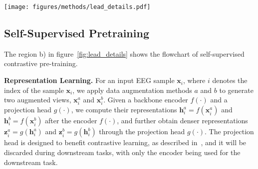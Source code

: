 \begin{figure*}
    \centering
    \texttt{[image: figures/methods/lead\_details.pdf]}
    \caption{\textbf{Details of LEAD method.} \textbf{a)} The pipeline for our method includes data preprocessing, sample indices shuffling, self-supervised pre-training, multi-dataset fine-tuning, sample-level classification, and subject-level AD detection. \textbf{b)} The flowchart of the self-supervised pre-training. A batch of samples is applied with two augmentations $a$ and $b$ to generate two augmented views, $\bm{x}_i^a$ and $\bm{x}_i^b$. The number in each sample is the subject ID. The representation $\bm{z}_i^a$ and $\bm{z}_i^b$ after encoder $f(\cdot)$ and projection head $g(\cdot)$ are used for contrastive learning. Two augmented views from the same sample are positive pairs for sample-level contrast. For subject-level contrast, samples with the same subject IDs are positive pairs. \textbf{c)} The backbone encoder $f(\cdot)$ includes two branches. The temporal branch takes cross-channel patches to embed as tokens. The spatial branch takes the whole series of channels to embed as tokens. The two branches are computed in parallel.
    }
    \label{fig:lead_details}
    \vspace{-5mm}
\end{figure*}



\subsection{Self-Supervised Pretraining}
\label{sub:self_supervised_pretraining}

The region b) in figure~\ref{fig:lead_details} shows the flowchart of self-supervised contrastive pre-training.



\textbf{Representation Learning.} For an input EEG sample $\bm{x}_i$, where $i$ denotes the index of the sample $\bm{x}_i$, we apply data augmentation methods $a$ and $b$ to generate two augmented views, $\bm{x}_i^a$ and $\bm{x}_i^b$. Given a backbone encoder $f(\cdot)$ and a projection head $g(\cdot)$, we compute their representations $\bm{h}_i^a = f(\bm{x}_i^a)$ and $\bm{h}_i^b = f(\bm{x}_i^b)$ after the encoder $f(\cdot)$, and further obtain denser representations $\bm{z}_i^a = g(\bm{h}_i^a)$ and $\bm{z}_i^b = g(\bm{h}_i^b)$ through the projection head $g(\cdot)$. The projection head is designed to benefit contrastive learning, as described in~\cite{chen2020simple}, and it will be discarded during downstream tasks, with only the encoder being used for the downstream task.




